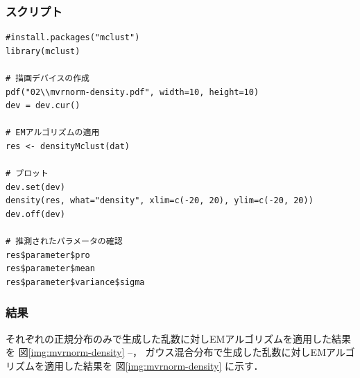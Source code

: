 \documentclass{jsarticle}
\begin{document}
\subsubsection*{スクリプト}
\begin{lstlisting}[basicstyle=\ttfamily\footnotesize, frame=single]
#install.packages("mclust")
library(mclust)

# 描画デバイスの作成
pdf("02\\mvrnorm-density.pdf", width=10, height=10)
dev = dev.cur()

# EMアルゴリズムの適用
res <- densityMclust(dat)

# プロット
dev.set(dev)
density(res, what="density", xlim=c(-20, 20), ylim=c(-20, 20))
dev.off(dev)

# 推測されたパラメータの確認
res$parameter$pro
res$parameter$mean
res$parameter$variance$sigma
\end{lstlisting}

\subsubsection*{結果}
それぞれの正規分布のみで生成した乱数に対しEMアルゴリズムを適用した結果を
図\ref{img:mvrnorm-density}
--，
ガウス混合分布で生成した乱数に対しEMアルゴリズムを適用した結果を
図\ref{img:mvrnorm-density}
に示す．
\end{document}
